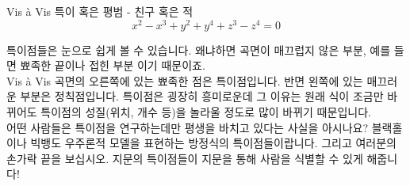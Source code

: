 ﻿\begin{surferPage}{Vis \`a Vis}
특이 혹은 평범 - 친구 혹은 적\\
\smallskip
\[x^2	- x^3+ y^2+ y^4+ z^3- z^4	=  0\]

\vspace{0.3cm}
특이점들은 눈으로 쉽게 볼 수 있습니다. 왜냐하면 곡면이 매끄럽지 않은 부분, 예를 들면 뾰족한 끝이나 접힌 부분 이기 때문이죠. \\
\vspace{0.3cm}
Vis \`a Vis 곡면의 오른쪽에 있는 뾰족한 점은 특이점입니다. 반면 왼쪽에 있는 매끄러운 부분은 정칙점입니다. 특이점은 굉장히 흥미로운데 그 이유는 원래 식이 조금만 바뀌어도 특이점의 성질(위치, 개수 등)을  놀라울 정도로 많이 바뀌기 때문입니다. \\

\vspace{0.3cm}
어떤 사람들은 특이점을 연구하는데만 평생을 바치고 있다는 사실을 아시나요? 블랙홀이나 빅뱅도 우주론적 모델을 표현하는 방정식의 특이점들이랍니다. 그리고 여러분의 손가락 끝을 보십시오. 지문의 특이점들이 지문을 통해 사람을 식별할 수 있게 해줍니다!
\end{surferPage}
